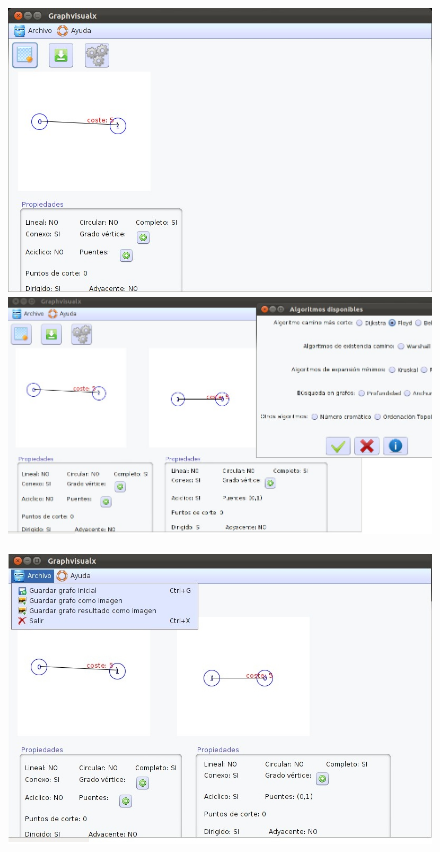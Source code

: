 \begin{itemize}
\begin{figure}[H]
\begin{center}
\end{center}
\end{figure}
\newpage
\begin{figure}[H]
\begin{center}
\includegraphics[width=14cm]{./imagenes_documentacion/Graphvisualx_13_11_2011/captura_3.jpeg}
\includegraphics[width=15cm]{./imagenes_documentacion/Graphvisualx_13_11_2011/captura_4.jpeg}
\end{center}
\end{figure}
\newpage
\begin{figure}[H]
\begin{center}
\includegraphics[width=15cm]{./imagenes_documentacion/Graphvisualx_13_11_2011/captura_5.jpeg}
\end{center}
\end{figure}


\end{itemize}

